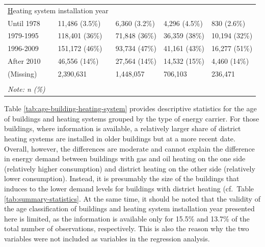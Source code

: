 \documentclass[12pt,twoside]{reedthesis}
\begin{document}
\begin{table}[]
{\begin{tabular}{@{}lllll@{}}
\multicolumn{2}{l}{{\ul Heating system installation year}} &                 &               &               \\
Until 1978                            & 11,486 (3.5\%)     & 6,360 (3.2\%)   & 4,296 (4.5\%) & 830 (2.6\%)   \\
1979-1995                             & 118,401 (36\%)     & 71,848 (36\%)   & 36,359 (38\%) & 10,194 (32\%) \\
1996-2009                             & 151,172 (46\%)     & 93,734 (47\%)   & 41,161 (43\%) & 16,277 (51\%) \\
After 2010                            & 46,556 (14\%)      & 27,564 (14\%)   & 14,532 (15\%) & 4,460 (14\%)  \\
(Missing)                             & 2,390,631          & 1,448,057       & 706,103       & 236,471       \\
                                      &                    &                 &               &               \\ \midrule
\textit{Note: n (\%)}                 &                    &                 &               &               \\ \bottomrule
\end{tabular}%
}
\end{table}
\noindent
Table \ref{tab:age-building-heating-system} provides descriptive statistics for the age of buildings and heating systems grouped by the type of energy carrier. For those buildings, where information is available, a relatively larger share of district heating systems are installed in older buildings but at a more recent date. Overall, however, the differences are moderate and cannot explain the difference in energy demand between buildings with gas and oil heating on the one side (relatively higher consumption) and district heating on the other side (relatively lower consumption). Instead, it is presumably the size of the buildings that induces to the lower demand levels for buildings with district heating (cf.~Table \ref{tab:summary-statistics}. At the same time, it should be noted that the validity of the age classification of buildings and heating system installation year presented here is limited, as the information is available only for 15.5\% and 13.7\% of the total number of observations, respectively. This is also the reason why the two variables were not included as variables in the regression analysis.
\end{document}
